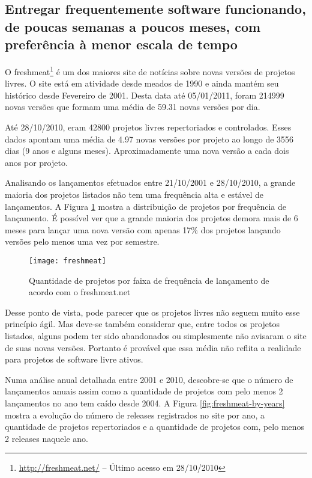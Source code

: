 \subsection[Entregas frequentes]{Entregar frequentemente software
  funcionando, de poucas semanas a poucos meses, com preferência à
  menor escala de tempo}

O freshmeat\footnote{\url{http://freshmeat.net/} -- Último acesso em
  28/10/2010} é um dos maiores site de notícias sobre novas versões de
projetos livres. O site está em atividade desde meados de 1990 e ainda
mantém seu histórico desde Fevereiro de 2001. Desta data até
05/01/2011, foram 214999 novas versões que formam uma média de 59.31
novas versões por dia.

Até 28/10/2010, eram 42800 projetos livres repertoriados e
controlados. Esses dados apontam uma média de 4.97 novas versões por
projeto ao longo de 3556 dias (9 anos e alguns meses).
Aproximadamente uma nova versão a cada dois anos por projeto.

Analisando os lançamentos efetuados entre 21/10/2001 e 28/10/2010, a
grande maioria dos projetos listados não tem uma frequência alta e
estável de lançamentos. A Figura \ref{fig:freshmeat} mostra a
distribuição de projetos por frequência de lançamento. É possível ver
que a grande maioria dos projetos demora mais de 6 meses para lançar
uma nova versão com apenas 17\% dos projetos lançando versões pelo
menos uma vez por semestre.

\begin{figure}
  \centering
  \texttt{[image: freshmeat]}
  \caption{Quantidade de projetos por faixa de frequência de
    lançamento de acordo com o freshmeat.net}
  \label{fig:freshmeat}
\end{figure}

Desse ponto de vista, pode parecer que os projetos livres não seguem
muito esse princípio ágil. Mas deve-se também considerar que, entre
todos os projetos listados, alguns podem ter sido abandonados ou
simplesmente não avisaram o site de suas novas versões. Portanto é
provável que essa média não reflita a realidade para projetos de
software livre ativos.

Numa análise anual detalhada entre 2001 e 2010, descobre-se que o
número de lançamentos anuais assim como a quantidade de projetos com
pelo menos 2 lançamentos no ano tem caído desde 2004. A Figura
\ref{fig:freshmeat-by-years} mostra a evolução do número de releases
registrados no site por ano, a quantidade de projetos repertoriados e
a quantidade de projetos com, pelo menos 2 releases naquele ano.

